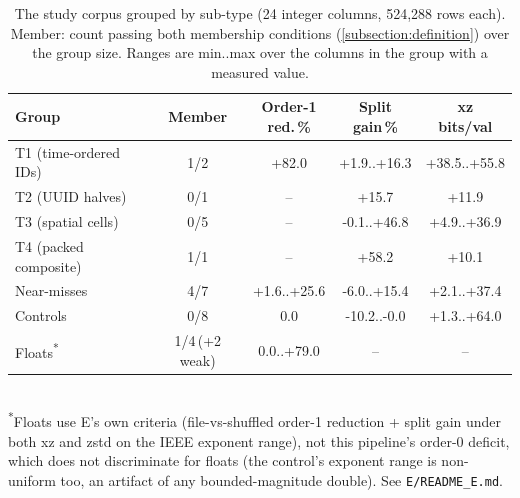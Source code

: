 \begin{table}[t]
  \footnotesize
  \setlength{\tabcolsep}{4pt}
  \caption{The study corpus grouped by sub-type (24 integer columns, 524{,}288 rows each). Member: count passing both membership conditions (\autoref{subsection:definition}) over the group size. Ranges are min..max over the columns in the group with a measured value.}
  \label{tab:class_study_grouped}
  \begin{tabular}{lcccc}
    \toprule
    Group & Member & \shortstack{Order-1\\red.\,\%} & \shortstack{Split\\gain\,\%} & \shortstack{xz\\bits/val} \\
    \midrule
    T1 (time-ordered IDs) & 1/2 & +82.0 & +1.9..+16.3 & +38.5..+55.8 \\
    T2 (UUID halves) & 0/1 & -- & +15.7 & +11.9 \\
    T3 (spatial cells) & 0/5 & -- & -0.1..+46.8 & +4.9..+36.9 \\
    T4 (packed composite) & 1/1 & -- & +58.2 & +10.1 \\
    Near-misses & 4/7 & +1.6..+25.6 & -6.0..+15.4 & +2.1..+37.4 \\
    Controls & 0/8 & 0.0 & -10.2..-0.0 & +1.3..+64.0 \\
    Floats\textsuperscript{*} & 1/4\,(+2 weak) & 0.0..+79.0 & -- & -- \\
    \bottomrule
  \end{tabular}
  \\[2pt]
  {\footnotesize\textsuperscript{*}Floats use E's own criteria (file-vs-shuffled order-1
  reduction + split gain under both xz and zstd on the IEEE exponent range), not this
  pipeline's order-0 deficit, which does not discriminate for floats (the control's exponent
  range is non-uniform too, an artifact of any bounded-magnitude double). See
  \texttt{E/README\_E.md}.}
\end{table}
